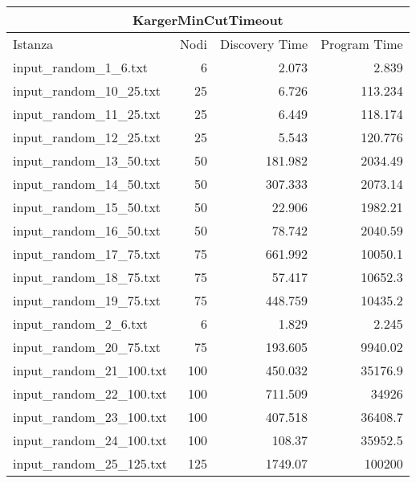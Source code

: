 \begin{table}[H]
    \centering

    \begin{tabular}{lrrr}
     \hline
     \multicolumn{4}{c}{KargerMinCutTimeout} \\
     \hline
     Istanza                    &   Nodi &   Discovery Time  &   Program Time \\
     \hline
     input\_random\_1\_6.txt    &       6 &            2.073 &          2.839 \\
     input\_random\_10\_25.txt  &      25 &            6.726 &        113.234 \\
     input\_random\_11\_25.txt  &      25 &            6.449 &        118.174 \\
     input\_random\_12\_25.txt  &      25 &            5.543 &        120.776 \\
     input\_random\_13\_50.txt  &      50 &          181.982 &       2034.49  \\
     input\_random\_14\_50.txt  &      50 &          307.333 &       2073.14  \\
     input\_random\_15\_50.txt  &      50 &           22.906 &       1982.21  \\
     input\_random\_16\_50.txt  &      50 &           78.742 &       2040.59  \\
     input\_random\_17\_75.txt  &      75 &          661.992 &      10050.1   \\
     input\_random\_18\_75.txt  &      75 &           57.417 &      10652.3   \\
     input\_random\_19\_75.txt  &      75 &          448.759 &      10435.2   \\
     input\_random\_2\_6.txt    &       6 &            1.829 &          2.245 \\
     input\_random\_20\_75.txt  &      75 &          193.605 &       9940.02  \\
     input\_random\_21\_100.txt &     100 &          450.032 &      35176.9   \\
     input\_random\_22\_100.txt &     100 &          711.509 &      34926     \\
     input\_random\_23\_100.txt &     100 &          407.518 &      36408.7   \\
     input\_random\_24\_100.txt &     100 &          108.37  &      35952.5   \\
     input\_random\_25\_125.txt &     125 &         1749.07  &     100200     \\

\end{tabular}
\end{table}
